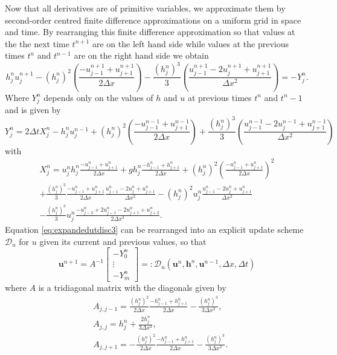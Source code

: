 Now that all derivatives are of primitive variables, we approximate them by second-order centred finite difference approximations on a uniform grid in space and time. By rearranging this finite difference approximation so that values at the the next time $t^{n+1}$ are on the left hand side while values at the previous times $t^{n}$ and $t^{n-1}$ are on the right hand side we obtain
%
\begin{equation}
h^{n}_ju^{n+1}_j - \left(h^{n}_j\right)^2 \left(\frac{-u^{n+1}_{j-1}+u^{n+1}_{j+1} }{2 \Delta x}\right) - \frac{\left(h^{n}_j\right)^3}{3}\left(\frac{u^{n+1}_{j-1} - 2u^{n+1}_{j}  +u^{n+1}_{j+1} }{\Delta x^2}\right) = - Y^n_j.
\label{eq:expandedutdisc3}
\end{equation}
%
Where $Y_j^n$ depends only on the values of $h$ and $u$ at previous times $t^n$ and $t^n-1$ and is given by
%
\begin{equation*}
Y_j^n = 2\Delta tX_j^{n} - h_j^{n}u_j^{n-1} + \left(h_j^{n}\right)^2\left(\frac{-u^{n-1}_{j-1}+u^{n-1}_{j+1}  }{2 \Delta x}\right) + \frac{\left(h_j^{n}\right)^3}{3}\left(\frac{u^{n-1}_{j-1} - 2u^{n-1}_{j} + u^{n-1}_{j+1} }{\Delta x^2}\right)
\label{eq:expandfactor Xp}
\end{equation*}
%
with
%
\begin{multline*}
X_j^n = u_j^nh_j^n\frac{-u^{n}_{j-1} + u^{n}_{j+1} }{2 \Delta x} + gh^n_j\frac{-h^{n}_{j-1} + h^{n}_{j+1} }{2 \Delta x} + \left(h^n_j\right)^2\left(\frac{-u^{n}_{j-1} + u^{n}_{j+1} }{2 \Delta x} \right)^2  \\ + \frac{\left(h^n_j\right)^3}{3}\frac{-u^{n}_{j-1} + u^{n}_{j+1} }{2 \Delta x}\frac{u^{n}_{j-1} - 2u^{n}_{j} + u^{n}_{j+1} }{\Delta x^2} - \left(h^n_j\right)^2u_j^n\frac{u^{n}_{j-1} - 2u^{n}_{j} + u^{n}_{j+1} }{\Delta x^2} \\- \frac{\left(h^n_j\right)^3}{3}u^n_j \frac{- u^{n}_{j-2} + 2u^{n}_{j-1} - 2u^{n}_{j+1} + u^{n}_{j+2}}{2\Delta x^3}.
\end{multline*}
%
Equation \eqref{eq:expandedutdisc3} can be rearranged into an explicit update scheme $\mathcal{D}_u$ for $u$ given its current and previous values, so that
%
\begin{equation}
\boldsymbol{u}^{n+ 1}
= A^{-1} \left[\begin{array}{c}
-Y^n_0 \\
\vdots \\
-Y^n_m \end{array}\right] =: \mathcal{D}_u\left(\boldsymbol{u}^n,\boldsymbol{h}^n, \boldsymbol{u}^{n-1}, \Delta x, \Delta t \right)
\label{eq:FDcentforu}
\end{equation}
%
where $A$ is a tridiagonal matrix with the diagonals given by
\begin{align}
	&A_{j,j-1} = \frac{\left(h^n_j\right)^2}{2\Delta x}\frac{- h^n_{j-1}+ h^n_{j+1}}{2\Delta x} - \frac{\left(h^n_j\right)^3}{3 \Delta x^2}  ,\\
	&A_{j,j} = h^n_j + \frac{2 h^n_j}{3 \Delta x^2}, \\
	&A_{j,j+1} = -\frac{\left(h^n_j\right)^2}{2\Delta x}\frac{- h^n_{j-1} + h^n_{j+1}}{2\Delta x} - \frac{\left(h^n_j\right)^3}{3 \Delta x^2}.
\end{align}



